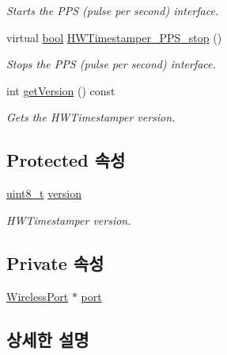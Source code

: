 \begin{DoxyCompactItemize}
\begin{DoxyCompactList}\small\item\em Starts the P\+PS (pulse per second) interface. \end{DoxyCompactList}\item 
virtual \hyperlink{avb__gptp_8h_af6a258d8f3ee5206d682d799316314b1}{bool} \hyperlink{class_common_timestamper_ac5d9f1e5eb402dffaa8897367e9fd7d3}{H\+W\+Timestamper\+\_\+\+P\+P\+S\+\_\+stop} ()
\begin{DoxyCompactList}\small\item\em Stops the P\+PS (pulse per second) interface. \end{DoxyCompactList}\item 
int \hyperlink{class_common_timestamper_a4d1414f8d9ed8d83c91769b148106307}{get\+Version} () const 
\begin{DoxyCompactList}\small\item\em Gets the H\+W\+Timestamper version. \end{DoxyCompactList}\end{DoxyCompactItemize}
\subsection*{Protected 속성}
\begin{DoxyCompactItemize}
\item 
\hyperlink{stdint_8h_aba7bc1797add20fe3efdf37ced1182c5}{uint8\+\_\+t} \hyperlink{class_common_timestamper_ab22abc2906422da61885ac6c8e6a1a59}{version}
\begin{DoxyCompactList}\small\item\em H\+W\+Timestamper version. \end{DoxyCompactList}\end{DoxyCompactItemize}
\subsection*{Private 속성}
\begin{DoxyCompactItemize}
\item 
\hyperlink{class_wireless_port}{Wireless\+Port} $\ast$ \hyperlink{class_wireless_timestamper_a16e2f76ce8715713c1d3db843c27d2d3}{port}
\end{DoxyCompactItemize}


\subsection{상세한 설명}


